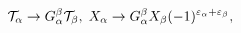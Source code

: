 \begin{equation}
{\cal T}_{\alpha}\rightarrow G_{\alpha}^{\beta}{\cal T}_{\beta
},\;X_{\alpha}\rightarrow G_{\alpha}^{\beta}X_{\beta}(-1)^{\varepsilon
_{\alpha}+\varepsilon_{\beta}},\label{3.6}%
\end{equation}

